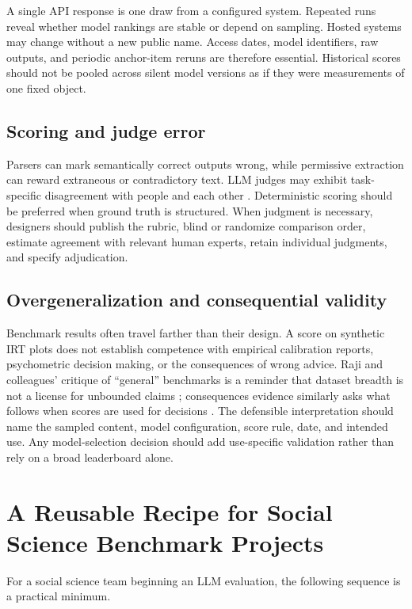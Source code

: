 \documentclass[12pt]{article}
\begin{document}
A single API response is one draw from a configured system. Repeated runs reveal whether model rankings are stable or depend on sampling. Hosted systems may change without a new public name. Access dates, model identifiers, raw outputs, and periodic anchor-item reruns are therefore essential. Historical scores should not be pooled across silent model versions as if they were measurements of one fixed object.

\subsection{Scoring and judge error}

Parsers can mark semantically correct outputs wrong, while permissive extraction can reward extraneous or contradictory text. LLM judges may exhibit task-specific disagreement with people and each other \citep{bavaresco2025judges}. Deterministic scoring should be preferred when ground truth is structured. When judgment is necessary, designers should publish the rubric, blind or randomize comparison order, estimate agreement with relevant human experts, retain individual judgments, and specify adjudication.

\subsection{Overgeneralization and consequential validity}

Benchmark results often travel farther than their design. A score on synthetic IRT plots does not establish competence with empirical calibration reports, psychometric decision making, or the consequences of wrong advice. Raji and colleagues' critique of ``general'' benchmarks is a reminder that dataset breadth is not a license for unbounded claims \citep{raji2021everything}; consequences evidence similarly asks what follows when scores are used for decisions \citep{lane2014consequences}. The defensible interpretation should name the sampled content, model configuration, score rule, date, and intended use. Any model-selection decision should add use-specific validation rather than rely on a broad leaderboard alone.

\section{A Reusable Recipe for Social Science Benchmark Projects}

For a social science team beginning an LLM evaluation, the following sequence is a practical minimum.
\end{document}
